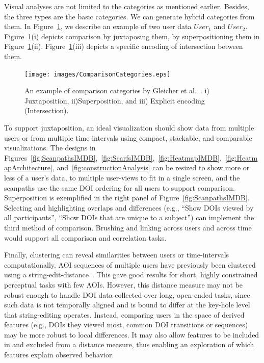 Visual analyses are not limited to the categories as mentioned earlier. Besides, the three types are the basic categories. We can generate hybrid categories from them. In Figure~\ref{fig:ComparisonCategories}, we describe an example of two user data $User_1$ and $User_2$. Figure~\ref{fig:ComparisonCategories}(i) depicts comparison by juxtaposing them, by superpositioning them in Figure~\ref{fig:ComparisonCategories}(ii). Figure~\ref{fig:ComparisonCategories}(iii) depicts a specific encoding of intersection between them.  
\begin{figure}[htbp]
  \centering
  \texttt{[image: images/ComparisonCategories.eps]}
  \caption{An example of comparison categories by Gleicher et al.~\cite{Glei11}. i) Juxtaposition, ii)Superposition, and iii) Explicit encoding (Intersection).}
	\label{fig:ComparisonCategories}
\end{figure}

To support juxtaposition, an ideal visualization should show data from multiple users or from multiple time intervals using compact, stackable, and comparable visualizations. The designs in Figures~\ref{fig:ScanpathsIMDB},~\ref{fig:ScarfsIMDB},~\ref{fig:HeatmapIMDB},~\ref{fig:HeatmapArchitecture}, and~\ref{fig:constructionAnalysis} can be resized to show more or less of a user's data, to multiple user-views to fit in a single screen, and the scanpaths use the same DOI ordering for all users to support comparison. Superposition is exemplified in the right panel of Figure~\ref{fig:ScanpathsIMDB}. Selecting and highlighting overlaps and differences (e.g., ``Show DOIs viewed by all participants'', ``Show DOIs that are unique to a subject'') can implement the third method of comparison. Brushing and linking across users and across time would support all comparison and correlation tasks.

Finally, clustering can reveal similarities between users or time-intervals computationally. AOI sequences of multiple users have previously been clustered using a string-edit-distance~\cite{Kur14}. This gave good results for short, highly constrained perceptual tasks with few AOIs. However, this distance measure may not be robust enough to handle DOI data collected over long, open-ended tasks, since such data is not temporally aligned and is bound to differ at the key-hole level that string-editing operates. Instead, comparing users in the space of derived features (e.g., DOIs they viewed most, common DOI transitions or sequences) may be more robust to local differences. It may also allow features to be included in and excluded from a distance measure, thus enabling an exploration of which features explain observed behavior.



